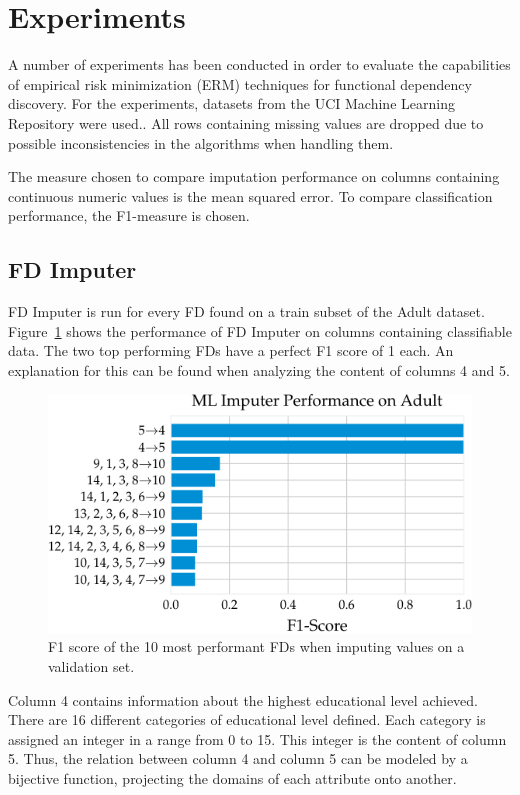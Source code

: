 \newpage
\section{Experiments}
A number of experiments has been conducted in order to evaluate the capabilities of empirical risk minimization (ERM) techniques for functional dependency discovery.
For the experiments, datasets from the UCI Machine Learning Repository were used.\cite{DUA19}.
All rows containing missing values are dropped due to possible inconsistencies in the algorithms when handling them.

The measure chosen to compare imputation performance on columns containing continuous numeric values is the mean squared error.
To compare classification performance, the F1-measure is chosen.

\subsection{FD Imputer}
FD Imputer is run for every FD found on a train subset of the Adult dataset.\cite{DUA19}
Figure~\ref{fig:f1_fd_adult} shows the performance of FD Imputer on columns containing classifiable data.
The two top performing FDs have a perfect F1 score of 1 each.
An explanation for this can be found when analyzing the content of columns 4 and 5.

\begin{figure}[ht]
     \centering
     \includegraphics[width=.8\textwidth]{../figures/adult/f1_fd_imputer_adult.pdf}
     \caption{F1 score of the 10 most performant FDs when imputing values on a validation set.}
     \label{fig:f1_fd_adult}
 \end{figure}

Column 4 contains information about the highest educational level achieved.
There are 16 different categories of educational level defined.
Each category is assigned an integer in a range from 0 to 15.
This integer is the content of column 5.
Thus, the relation between column 4 and column 5 can be modeled by a bijective function, projecting the domains of each attribute onto another.


